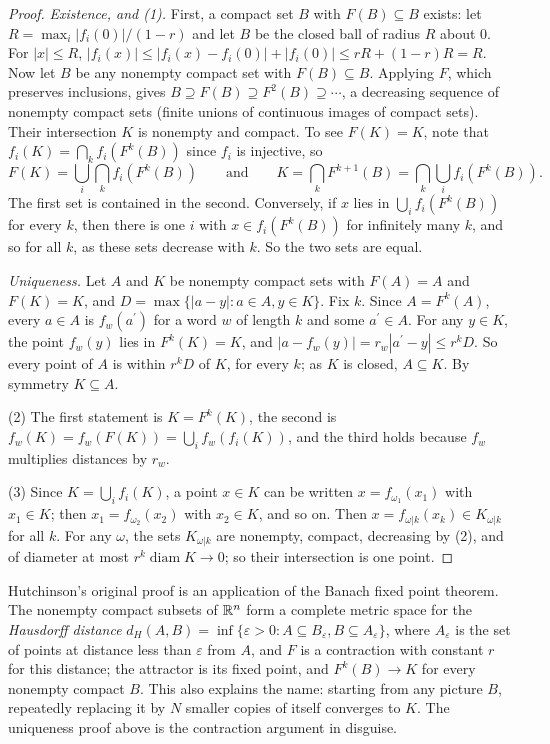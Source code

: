 \begin{proof}
\emph{Existence, and (1).} First, a compact set $B$ with $F(B) \subseteq B$ exists: let $R = \max_i|f_i(0)|/(1 - r)$ and let $B$ be the closed ball of radius $R$ about $0$. For $|x| \leq R$,
$|f_i(x)| \leq |f_i(x) - f_i(0)| + |f_i(0)| \leq rR + (1 - r)R = R$. Now let $B$ be any nonempty compact set with $F(B) \subseteq B$. Applying $F$, which preserves inclusions, gives
$B \supseteq F(B) \supseteq F^2(B) \supseteq \cdots$, a decreasing sequence of nonempty compact sets (finite unions of continuous images of compact sets). Their intersection $K$ is nonempty and compact. To
see $F(K) = K$, note that $f_i(K) = \bigcap_kf_i(F^k(B))$ since $f_i$ is injective, so
\[
F(K) = \bigcup_i\bigcap_kf_i(F^k(B)) \qquad\text{and}\qquad K = \bigcap_kF^{k+1}(B) = \bigcap_k\bigcup_if_i(F^k(B)).
\]
The first set is contained in the second. Conversely, if $x$ lies in $\bigcup_if_i(F^k(B))$ for every $k$, then there is one $i$ with $x \in f_i(F^k(B))$ for infinitely many $k$, and so for all $k$, as
these sets decrease with $k$. So the two sets are equal.

\emph{Uniqueness.} Let $A$ and $K$ be nonempty compact sets with $F(A) = A$ and $F(K) = K$, and $D = \max\{|a - y| : a \in A, y \in K\}$. Fix $k$. Since $A = F^k(A)$, every $a \in A$ is $f_w(a^{\prime})$
for a word $w$ of length $k$ and some $a^{\prime} \in A$. For any $y \in K$, the point $f_w(y)$ lies in $F^k(K) = K$, and $|a - f_w(y)| = r_w|a^{\prime} - y| \leq r^kD$. So every point of $A$ is
within $r^kD$ of $K$, for every $k$; as $K$ is closed, $A \subseteq K$. By symmetry $K \subseteq A$.

(2) The first statement is $K = F^k(K)$, the second is $f_w(K) = f_w(F(K)) = \bigcup_if_w(f_i(K))$, and the third holds because $f_w$ multiplies distances by $r_w$.

(3) Since $K = \bigcup_if_i(K)$, a point $x \in K$ can be written $x = f_{\omega_1}(x_1)$ with $x_1 \in K$; then $x_1 = f_{\omega_2}(x_2)$ with $x_2 \in K$, and so on. Then
$x = f_{\omega|k}(x_k) \in K_{\omega|k}$ for all $k$. For any $\omega$, the sets $K_{\omega|k}$ are nonempty, compact, decreasing by (2), and of diameter at most $r^k\operatorname{diam}K \to 0$; so
their intersection is one point.
\end{proof}

\begin{remark}\label{measure-theory:remark-hutchinson}
Hutchinson's original proof \cite{hutchinson-1981} is an application of the Banach fixed point theorem. The nonempty compact subsets of $\mathbb{R}^n$ form a complete metric space for the
\emph{Hausdorff distance} $d_H(A, B) = \inf\{\varepsilon > 0 : A \subseteq B_\varepsilon, B \subseteq A_\varepsilon\}$, where $A_\varepsilon$ is the set of points at distance less than $\varepsilon$ from
$A$, and $F$ is a contraction with constant $r$ for this distance; the attractor is its fixed point, and $F^k(B) \to K$ for every nonempty compact $B$. This also explains the name: starting from any
picture $B$, repeatedly replacing it by $N$ smaller copies of itself converges to $K$. The uniqueness proof above is the contraction argument in disguise.
\end{remark}


